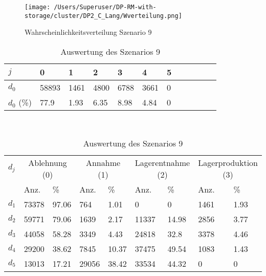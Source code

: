 \begin{figure}[h!]
  \begin{center}
    \texttt{[image: /Users/Superuser/DP-RM-with-storage/cluster/DP2\_C\_Lang/Wverteilung.png]}
    \caption{Wahrscheinlichkeitsverteilung Szenario 9}  \label{SB9}
  \end{center}
\end{figure}

\begin{table}[h!]
\renewcommand{\arraystretch}{1.5}
  \begin{center}
    \caption{Auswertung des Szenarios 9}  \label{AS9}
    \vspace*{3mm}
    \begin{tabular}{l l l l l l l l l l l l }  \hline 
         $j$ & 0 & 1  & 2 & 3 & 4  & 5   \\  \hline
$d_{0}$ &  58893 &  1461 &  4800 &  6788 &  3661 &  0 \\
$d_{0}$ (\%) &   77.9 &  1.93 &  6.35 &  8.98 &  4.84 &  0 \\\hline
    \end{tabular} \\[3mm]
        \begin{tabular}{ l l l l l l l l l}   \hline    %
    $d_j$ & \multicolumn{2}{c}{Ablehnung (0)} & \multicolumn{2}{c}{Annahme (1)}  & \multicolumn{2}{c}{Lagerentnahme (2)} & \multicolumn{2}{c}{Lagerproduktion (3)}\\
    & Anz. & \% & Anz. & \% & Anz. & \% & Anz. & \% \\ \hline 
$d_{1}$ &  73378 &  97.06 &    764 &   1.01 &    0 &    0 &  1461 &  1.93 \\
$d_{2}$ &  59771 &  79.06 &   1639 &   2.17 &  11337 &  14.98 &  2856 &  3.77 \\
$d_{3}$ &  44058 &  58.28 &   3349 &   4.43 &  24818 &   32.8 &  3378 &  4.46 \\
$d_{4}$ &  29200 &  38.62 &   7845 &  10.37 &  37475 &  49.54 &  1083 &  1.43 \\
$d_{5}$ &  13013 &  17.21 &  29056 &  38.42 &  33534 &  44.32 &   0 &   0 \\
          \hline
   \end{tabular} \\[3mm]
     \end{center}
\end{table}





